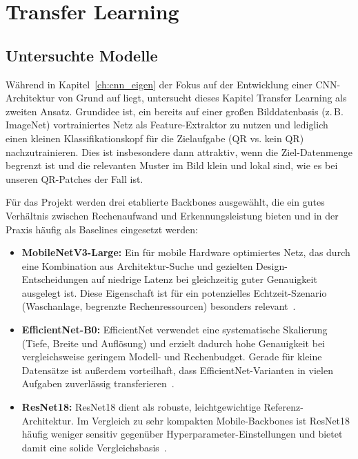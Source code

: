 \chapter{Transfer Learning}
\label{ch:transferlearning}

\section{Untersuchte Modelle}
\label{sec:transfer_modelle}

Während in Kapitel~\ref{ch:cnn_eigen} der Fokus auf der Entwicklung einer \ac{CNN}-Architektur von Grund auf liegt, untersucht dieses Kapitel Transfer Learning als zweiten Ansatz. Grundidee ist, ein bereits auf einer großen Bilddatenbasis (z.\,B. ImageNet) vortrainiertes Netz als Feature-Extraktor zu nutzen und lediglich einen kleinen Klassifikationskopf für die Zielaufgabe (\ac{QR} vs. kein \ac{QR}) nachzutrainieren. Dies ist insbesondere dann attraktiv, wenn die Ziel-Datenmenge begrenzt ist und die relevanten Muster im Bild klein und lokal sind, wie es bei unseren \ac{QR}-Patches der Fall ist.

Für das Projekt werden drei etablierte Backbones ausgewählt, die ein gutes Verhältnis zwischen Rechenaufwand und Erkennungsleistung bieten und in der Praxis häufig als Baselines eingesetzt werden:

\begin{itemize}
    \item \textbf{MobileNetV3-Large:} Ein für mobile Hardware optimiertes Netz, das durch eine Kombination aus Architektur-Suche und gezielten Design-Entscheidungen auf niedrige Latenz bei gleichzeitig guter Genauigkeit ausgelegt ist. Diese Eigenschaft ist für ein potenzielles Echtzeit-Szenario (Waschanlage, begrenzte Rechenressourcen) besonders relevant~\cite{howard2019mobilenetv3}.
    \item \textbf{EfficientNet-B0:} EfficientNet verwendet eine systematische Skalierung (Tiefe, Breite und Auflösung) und erzielt dadurch hohe Genauigkeit bei vergleichsweise geringem Modell- und Rechenbudget. Gerade für kleine Datensätze ist außerdem vorteilhaft, dass EfficientNet-Varianten in vielen Aufgaben zuverlässig transferieren~\cite{tan2019efficientnet}.
    \item \textbf{ResNet18:} ResNet18 dient als robuste, leichtgewichtige Referenz-Architektur. Im Vergleich zu sehr kompakten Mobile-Backbones ist ResNet18 häufig weniger sensitiv gegenüber Hyperparameter-Einstellungen und bietet damit eine solide Vergleichsbasis~\cite{he2016deep}.
\end{itemize}

